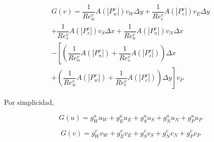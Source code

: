 \begin{equation}
\begin{split}
G(v) = \dfrac{1}{Re_w^v} A(|P_w^v|) v_W \Delta y + \dfrac{1}{Re_e^v} A(|P_e^v|) v_E \Delta y \\ + \dfrac{1}{Re_s^v} A(|P_s^v|) v_S \Delta x + \dfrac{1}{Re_n^v} A(|P_n^v|) v_N \Delta x \\ - \left[ \left( \dfrac{1}{Re_n^v} A(|P_n^v|) + \dfrac{1}{Re_s^v} A(|P_s^v|) \right) \Delta x \right. \\ + \left. \left( \dfrac{1}{Re_w^v} A(|P_w^v|) + \dfrac{1}{Re_e^v} A(|P_e^v|) \right) \Delta y \right] v_P
\end{split}
\end{equation}

Por simplicidad,

\begin{equation}
G(u) = g_W^u u_W + g_E^u u_E + g_S^u u_S + g_N^u u_N + g_P^u u_P
\end{equation}

\begin{equation}
G(v) = g_W^v v_W + g_E^v v_E + g_S^v v_S + g_N^v v_N + g_P^v v_P
\end{equation}

